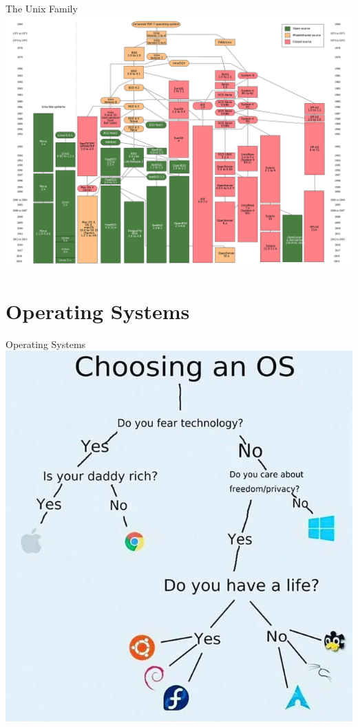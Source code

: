 \documentclass[11pt]{beamer}
\begin{document}
\begin{frame}{The Unix Family}
\center
\includegraphics[scale=0.1]{unixfamily.png}
\end{frame}

\section[Operating Systems]{Operating Systems}
\begin{frame}{Operating Systems}
\center
\includegraphics[scale=0.25]{OSs.png}
\end{frame}
\end{document}
